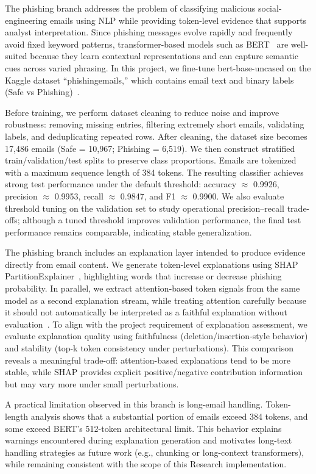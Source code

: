 \documentclass[conference]{IEEEtran}
\begin{document}
The phishing branch addresses the problem of classifying malicious social-engineering emails using NLP while providing token-level evidence that supports analyst interpretation. Since phishing messages evolve rapidly and frequently avoid fixed keyword patterns, transformer-based models such as BERT~\cite{JMKK2019} are well-suited because they learn contextual representations and can capture semantic cues across varied phrasing. In this project, we fine-tune bert-base-uncased on the Kaggle dataset “phishingemails,” which contains email text and binary labels (Safe vs Phishing)~\cite{phishingDT}.

Before training, we perform dataset cleaning to reduce noise and improve robustness: removing missing entries, filtering extremely short emails, validating labels, and deduplicating repeated rows. After cleaning, the dataset size becomes 17,486 emails (Safe = 10,967; Phishing = 6,519). We then construct stratified train/validation/test splits to preserve class proportions. Emails are tokenized with a maximum sequence length of 384 tokens. The resulting classifier achieves strong test performance under the default threshold: accuracy $\approx$ 0.9926, precision $\approx$ 0.9953, recall $\approx$ 0.9847, and F1 $\approx$ 0.9900. We also evaluate threshold tuning on the validation set to study operational precision--recall trade-offs; although a tuned threshold improves validation performance, the final test performance remains comparable, indicating stable generalization.

The phishing branch includes an explanation layer intended to produce evidence directly from email content. We generate token-level explanations using SHAP PartitionExplainer~\cite{LL2017}, highlighting words that increase or decrease phishing probability. In parallel, we extract attention-based token signals from the same model as a second explanation stream, while treating attention carefully because it should not automatically be interpreted as a faithful explanation without evaluation~\cite{JW2019}. To align with the project requirement of explanation assessment, we evaluate explanation quality using faithfulness (deletion/insertion-style behavior) and stability (top-k token consistency under perturbations). This comparison reveals a meaningful trade-off: attention-based explanations tend to be more stable, while SHAP provides explicit positive/negative contribution information but may vary more under small perturbations.

A practical limitation observed in this branch is long-email handling. Token-length analysis shows that a substantial portion of emails exceed 384 tokens, and some exceed BERT’s 512-token architectural limit. This behavior explains warnings encountered during explanation generation and motivates long-text handling strategies as future work (e.g., chunking or long-context transformers), while remaining consistent with the scope of this Research implementation.
\end{document}
